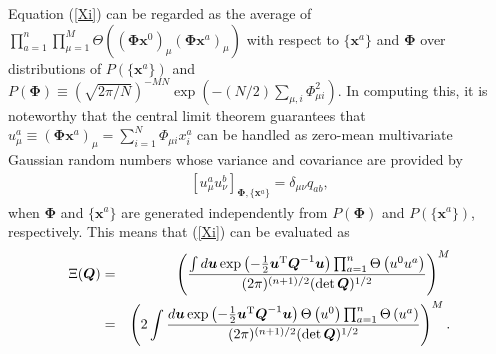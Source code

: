\documentclass[12pt]{iopart}
\newcommand{\vm}[1]{\boldsymbol{#1}}
\begin{document}
Equation (\ref{Xi}) can be regarded as the average of $\prod_{a=1}^n \prod_{\mu=1}^M \Theta\left((\vm{\Phi} \vm{x}^0)_\mu (\vm{\Phi} \vm{x}^a)_\mu \right)$ with respect to $\{\vm{x}^a\}$ and $\vm{\Phi}$ over distributions of $P\left (\{\vm{x}^a\} \right )$ and $P(\vm{\Phi}) \equiv \left (\sqrt{2\pi/N} \right )^{-MN} \exp \left (-(N/2) \sum_{\mu,i} \Phi_{\mu i}^2 \right )$. In computing this, it is noteworthy that the central limit theorem guarantees that $u_\mu^a \equiv (\vm{\Phi} \vm{x}^a)_\mu = \sum_{i=1}^N \Phi_{\mu i} x_i^a$ can be handled as zero-mean multivariate Gaussian random numbers whose variance and covariance are provided by 
\begin{eqnarray}
\left [u_\mu^a u_\nu^b \right ]_{\vm{\Phi},\{\vm{x}^a\}}
=\delta_{\mu \nu} q_{ab}, 
\end{eqnarray}
when $\vm{\Phi}$ and $\{\vm{x}^a\}$ are generated independently from $P(\vm{\Phi})$ and $P\left (\{\vm{x}^a\} \right )$, respectively. This means that (\ref{Xi}) can be evaluated as
\begin{eqnarray}
\Xi(\vm{Q}) &=&\left (\frac{\int d \vm{u} \exp\left (-\frac{1}{2}\vm{u}^{\rm T} \vm{Q}^{-1} \vm{u} \right )
\prod_{a=1}^n \Theta\left (u^0 u^a \right )  }{
(2\pi)^{(n+1)/2} (\det \vm{Q})^{1/2}}
\right )^M \cr
&=& \left (2 \int \frac{ d \vm{u}\exp\left (-\frac{1}{2}\vm{u}^{\rm T} \vm{Q}^{-1} \vm{u} \right )
\Theta\left (u^0 \right )\prod_{a=1}^n \Theta\left (u^a \right )  }{
(2\pi)^{(n+1)/2} (\det \vm{Q})^{1/2}}
 \right )^M. 
\label{logXi}
\end{eqnarray}
\end{document}

